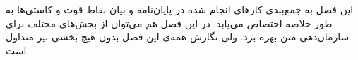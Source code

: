 
این فصل به جمع‌بندی کارهای انجام شده در پایان‌نامه و بیان نقاط قوت و کاستی‌ها به طور خلاصه اختصاص می‌یابد. در این فصل هم می‌توان از بخش‌های مختلف برای سازمان‌دهی متن بهره برد. ولی نگارش همه‌ی این فصل بدون هیچ بخشی نیز متداول است.
